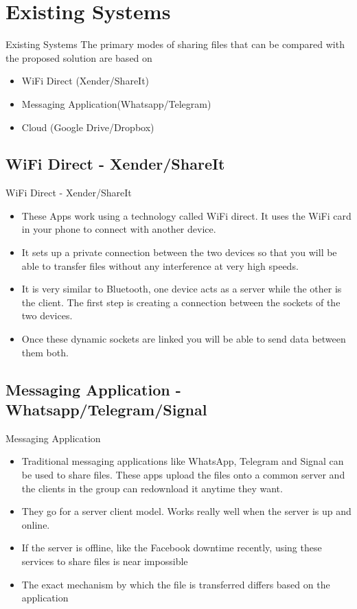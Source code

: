 \documentclass[9pt]{beamer}
\begin{document}
\section{Existing Systems }
\begin{frame} {Existing Systems }
The primary modes of sharing files that can be compared with the proposed solution are based on
\begin{itemize}
    \item WiFi Direct (Xender/ShareIt)
    \item Messaging Application(Whatsapp/Telegram)
    \item Cloud (Google Drive/Dropbox)
\end{itemize}
\end{frame} 

\subsection{WiFi Direct - Xender/ShareIt}
\begin{frame}{WiFi Direct - Xender/ShareIt}
 \begin{itemize}
     \item These Apps work using a technology called WiFi direct. It uses the WiFi card in your phone to connect with another device. 
     \item It sets up a private connection between the two devices so that you will be able to transfer files without any interference at very high speeds. 
     \item It is very similar to Bluetooth, one device acts as a server while the other is the client. The first step is creating a connection between the sockets of the two devices. 
     \item Once these dynamic sockets are linked you will be able to send data between them both.
 \end{itemize}
 \end{frame}

\subsection{Messaging Application - Whatsapp/Telegram/Signal}
\begin{frame}{Messaging Application}
 \begin{itemize}
     \item Traditional messaging applications like WhatsApp, Telegram and Signal can be used to share files. These apps upload the files onto a common server and the clients in the group can redownload it anytime they want.
     \item They go for a server client model. Works really well when the server is up and online.
     \item If the server is offline, like the Facebook downtime recently, using these services to share files is near impossible
     \item The exact mechanism by which the file is transferred differs based on the application
 \end{itemize}
                 
\end{frame}
\end{document}
